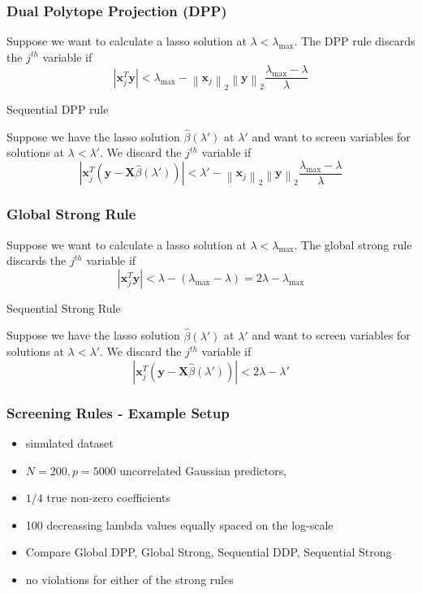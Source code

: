 \documentclass{beamer}
\newcommand{\Norm}[1]{\left\lVert#1\right\rVert}
\newcommand{\norm}[1]{\left\lvert#1\right\rvert}
\begin{document}
\begin{frame}
\frametitle{Dual Polytope Projection (DPP)}
Suppose we want to calculate a lasso solution at $\lambda<\lambda_{\max}$. The DPP rule discards the $j^{th}$ variable if 
\[\norm{\mathbf{x}_j^T\mathbf{y}}<\lambda_{\max}-\Norm{\mathbf{x}_j}_2\Norm{\mathbf{y}}_2\frac{\lambda_{\max}-\lambda}{\lambda}\]

\vspace{5pt}
{\hspace{5pt}\Large Sequential DPP rule}
\vspace{15pt}

Suppose we have the lasso solution $\hat\beta(\lambda')$ at $\lambda'$ and want to screen variables for solutions at $\lambda<\lambda'$. We discard the $j^{th}$ variable if 
\[\norm{\mathbf{x}_j^T(\mathbf{y}-\mathbf{X}\hat{\beta}(\lambda'))}<\lambda'-\Norm{\mathbf{x}_j}_2\Norm{\mathbf{y}}_2\frac{\lambda_{\max}-\lambda}{\lambda}\]
\end{frame}

\begin{frame}
\frametitle{Global Strong Rule}
Suppose we want to calculate a lasso solution at $\lambda<\lambda_{\max}$. The global strong rule discards the $j^{th}$ variable if 
\[\norm{\mathbf{x}_j^T\mathbf{y}}<\lambda-(\lambda_{\max}-\lambda)=2\lambda-\lambda_{\max}\]

\vspace{5pt}
{\hspace{5pt}\Large Sequential Strong Rule}
\vspace{15pt}

Suppose we have the lasso solution $\hat\beta(\lambda')$ at $\lambda'$ and want to screen variables for solutions at $\lambda<\lambda'$. We discard the $j^{th}$ variable if 
\[\norm{\mathbf{x}_j^T(\mathbf{y}-\mathbf{X}\hat{\beta}(\lambda'))}<2\lambda-\lambda'\]
\end{frame}

\begin{frame}
\frametitle{Screening Rules - Example Setup}

\begin{itemize}
	\item simulated dataset
	\item $N = 200, p = 5000$ uncorrelated Gaussian predictors, 
	\item $1/4$ true non-zero coefficients 
	\item 100 decreassing lambda values equally spaced on the log-scale
	\item Compare Global DPP, Global Strong, Sequential DDP, Sequential Strong
	\item no violations for either of the strong rules
\end{itemize}

\end{frame}
\end{document}
